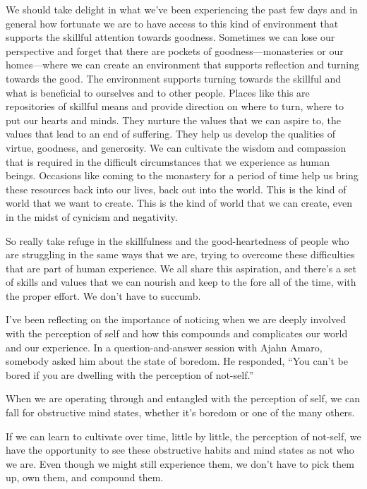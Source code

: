 We should take delight in what we've been experiencing the past few days and in general how fortunate we are to have access to this kind of environment that supports the skillful attention towards goodness. Sometimes we can lose our perspective and forget that there are pockets of goodness---monasteries or our homes---where we can create an environment that supports reflection and turning towards the good. The environment supports turning towards the skillful and what is beneficial to ourselves and to other people. Places like this are repositories of skillful means and provide direction on where to turn, where to put our hearts and minds. They nurture the values that we can aspire to, the values that lead to an end of suffering. They help us develop the qualities of virtue, goodness, and generosity. We can cultivate the wisdom and compassion that is required in the difficult circumstances that we experience as human beings. Occasions like coming to the monastery for a period of time help us bring these resources back into our lives, back out into the world. This is the kind of world that we want to create. This is the kind of world that we can create, even in the midst of cynicism and negativity.

So really take refuge in the skillfulness and the good-heartedness of people who are struggling in the same ways that we are, trying to overcome these difficulties that are part of human experience. We all share this aspiration, and there's a set of skills and values that we can nourish and keep to the fore all of the time, with the proper effort. We don't have to succumb.

I've been reflecting on the importance of noticing when we are deeply involved with the perception of self and how this compounds and complicates our world and our experience. In a question-and-answer session with Ajahn Amaro, somebody asked him about the state of boredom. He responded, ``You can't be bored if you are dwelling with the perception of not-self.''~

When we are operating through and entangled with the perception of self, we can fall for obstructive mind states, whether it's boredom or one of the many others.

If we can learn to cultivate over time, little by little, the perception of not-self, we have the opportunity to see these obstructive habits and mind states as not who we are. Even though we might still experience them, we don't have to pick them up, own them, and compound them.

